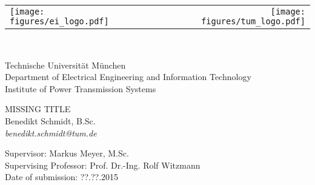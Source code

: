\begin{titlepage}
	
	\begin{tabularx}{\textwidth}{lXr}
		\texttt{[image: figures/ei\_logo.pdf]} &	& \texttt{[image: figures/tum\_logo.pdf]}
	\end{tabularx}
	\hfill \\[1cm]
	
	\begin{flushleft}
		Technische Universität München \\
		Department of Electrical Engineering and Information Technology \\
		Institute of Power Transmission Systems \\[4cm]
	\end{flushleft}
		
	\begin{center}
		\huge
		MISSING TITLE \\[1cm]
		\large
		Benedikt Schmidt, B.Sc. \\
		\textit{benedikt.schmidt@tum.de} \\[7cm]
	\end{center}
	
	\begin{flushleft}
		Supervisor: Markus Meyer, M.Sc. \\
		Supervising Professor: Prof. Dr.-Ing. Rolf Witzmann \\
		Date of submission: ??.??.2015
	\end{flushleft}
\end{titlepage}